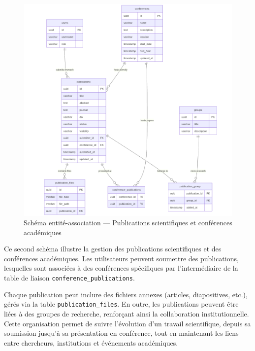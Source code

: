 \documentclass{rapportPfe}
\begin{document}
\begin{figure}[H]
    \centering
    \includegraphics[width=1.0\textwidth]{diagrams/diagram7.png}
    \caption{Schéma entité-association — Publications scientifiques et conférences académiques}
    \label{fig:diagram7}
\end{figure}

Ce second schéma illustre la gestion des publications scientifiques et des conférences académiques. Les utilisateurs peuvent soumettre des publications, lesquelles sont associées à des conférences spécifiques par l’intermédiaire de la table de liaison \texttt{conference\_publications}. 

Chaque publication peut inclure des fichiers annexes (articles, diapositives, etc.), gérés via la table \texttt{publication\_files}. En outre, les publications peuvent être liées à des groupes de recherche, renforçant ainsi la collaboration institutionnelle. Cette organisation permet de suivre l’évolution d’un travail scientifique, depuis sa soumission jusqu’à sa présentation en conférence, tout en maintenant les liens entre chercheurs, institutions et événements académiques.
\end{document}
